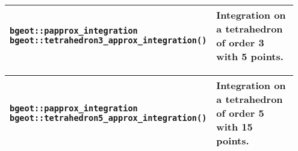 \begin{center}
\begin{tabular}{|m{0.55\linewidth}|m{0.4\linewidth}|}
\end{tabular} 
\begin{tabular}{|m{0.55\linewidth}|m{0.4\linewidth}|} \hline
{\tt bgeot::papprox\_integration bgeot::tetrahedron3\_approx\_integration()} & Integration on a tetrahedron of order 3 with 5 points. \\ \hline
\end{tabular} 
\begin{tabular}{|m{0.55\linewidth}|m{0.4\linewidth}|} \hline
{\tt bgeot::papprox\_integration bgeot::tetrahedron5\_approx\_integration()} & Integration on a tetrahedron of order 5 with 15 points. \\ \hline
\end{tabular} \end{center}
